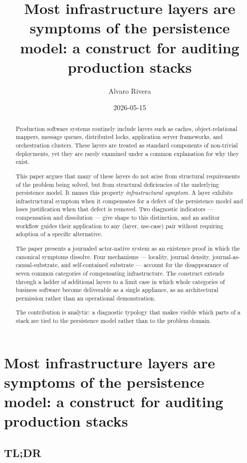 \documentclass[
]{article}
\title{Most infrastructure layers are symptoms of the persistence model:
a construct for auditing production stacks}
\author{Alvaro Rivera}
\date{2026-05-15}
\begin{document}
\maketitle
\begin{abstract}
Production software systems routinely include layers such as caches,
object-relational mappers, message queues, distributed locks,
application server frameworks, and orchestration clusters. These layers
are treated as standard components of non-trivial deployments, yet they
are rarely examined under a common explanation for why they exist.

This paper argues that many of these layers do not arise from structural
requirements of the problem being solved, but from structural
deficiencies of the underlying persistence model. It names this property
\emph{infrastructural symptom}. A layer exhibits infrastructural symptom
when it compensates for a defect of the persistence model and loses
justification when that defect is removed. Two diagnostic indicators ---
compensation and dissolution --- give shape to this distinction, and an
auditor workflow guides their application to any (layer, use-case) pair
without requiring adoption of a specific alternative.

The paper presents a journaled actor-native system as an existence proof
in which the canonical symptoms dissolve. Four mechanisms --- locality,
journal density, journal-as-causal-substrate, and self-contained
substrate --- account for the disappearance of seven common categories
of compensating infrastructure. The construct extends through a ladder
of additional layers to a limit case in which whole categories of
business software become deliverable as a single appliance, as an
architectural permission rather than an operational demonstration.

The contribution is analytic: a diagnostic typology that makes visible
which parts of a stack are tied to the persistence model rather than to
the problem domain.
\end{abstract}

\section{Most infrastructure layers are symptoms of the persistence
model: a construct for auditing production
stacks}\label{most-infrastructure-layers-are-symptoms-of-the-persistence-model-a-construct-for-auditing-production-stacks}

\subsection{TL;DR}\label{tldr}
\end{document}
